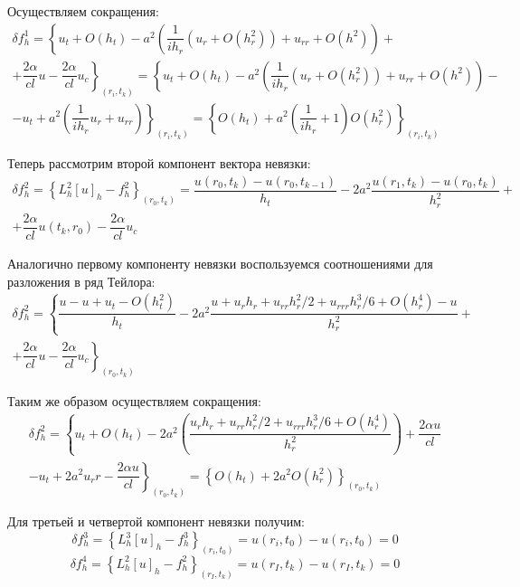 \documentclass[a4paper,14pt,russian, fleqn]{extreport}
\begin{document}
 	Осуществляем сокращения:
 	\begin{eqnarray}
 		\delta f_h^1 = \left\{ u_t + O(h_t) - a^2 \left( \dfrac{1}{ih_r}(u_r + O(h_r^2)) + u_{rr} + O(h^2) \right)  + \nonumber \right. \\ 
 		\left. +  \dfrac{2\alpha}{cl}u - \dfrac{2\alpha}{cl}u_c \right\}_{(r_i, t_k)} = \left\{ u_t + O(h_t) - a^2 \left( \dfrac{1}{ih_r}(u_r + O(h_r^2)) + u_{rr} + O(h^2) \right) -\right. \nonumber \\ \left. - u_t + a^2 \left( \dfrac{1}{ih_r}u_r + u_{rr} \right)\right\}_{(r_i, t_k)} = \left\{O(h_t) + a^2\left(\dfrac{1}{ih_r} + 1 \right)O(h_r^2)\right\}_{(r_i, t_k)} \nonumber
 	\end{eqnarray}
 	
 	Теперь рассмотрим второй компонент вектора невязки:
 	\begin{eqnarray}
	 	\delta f^2_h = \left\{ L_h^2[u]_h - f^2_h \right\}_{(r_0, t_k)} = \dfrac{u(r_0, t_k) - u(r_0, t_{k-1})}{h_t} - 2a^2\dfrac{u(r_1, t_k) - u(r_0, t_k)}{h_r^2} + \nonumber \\
	 	+ \dfrac{2\alpha}{cl}u(t_k, r_0) - \dfrac{2\alpha}{cl}u_c \nonumber
 	\end{eqnarray}
 	
 	Аналогично первому компоненту невязки воспользуемся соотношениями для разложения в ряд Тейлора:
 	\begin{eqnarray}
 		\delta f^2_h = \left\{ \dfrac{u - u + u_t - O(h_t^2)}{h_t} - 2a^2\dfrac{u+u_rh_r + u_{rr}h_r^2/2 + u_{rrr}h_r^3/6  + O(h_r^4) - u}{h_r^2} + \nonumber \right.  \\ 
 		\left.  + \dfrac{2\alpha}{cl}u - \dfrac{2\alpha}{cl}u_c\right\}_{(r_0, t_k)} \nonumber
 	\end{eqnarray}
 	
 	Таким же образом осуществляем сокращения:
 	\begin{eqnarray}
	 	\delta f^2_h = \left\{ u_t + O(h_t) - 2a^2 \left(\dfrac{u_rh_r + u_{rr}h_r^2/2 + u_{rrr}h_r^3/6+O(h_r^4)}{h_r^2} \right) + \dfrac{2\alpha u}{cl} \right. \nonumber \\
	 	\left. - u_t + 2a^2u_rr - \dfrac{2\alpha u}{cl} \right\}_{(r_0, t_k)} = \left\{ O(h_t) + 2a^2O(h_r^2)\right\}_{(r_0, t_k)} \nonumber
 	\end{eqnarray}
 	
 	Для третьей и четвертой компонент невязки получим:
 	\begin{equation*}
	 	\delta f^3_h = \left\{ L_h^3[u]_h - f^3_h \right\}_{(r_i, t_0)} = u(r_i, t_0) - u(r_i, t_0) = 0
 	\end{equation*}
 	\begin{equation*}
	 	\delta f^4_h = \left\{ L_h^2[u]_h - f^2_h \right\}_{(r_I, t_k)} = u(r_I, t_k) - u(r_I, t_k) = 0
 	\end{equation*}
 	
\end{document}
